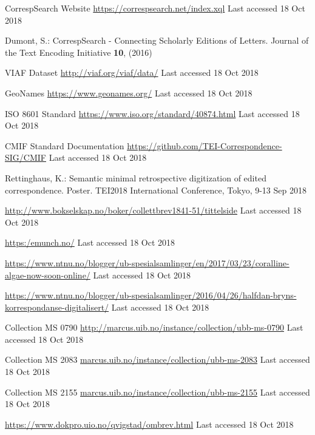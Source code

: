 \documentclass[runningheads]{llncs}
\begin{document}
\begin{thebibliography}{8}

CorrespSearch Website \url{https://correspsearch.net/index.xql}
Last accessed 18 Oct 2018

Dumont, S.: CorrespSearch - Connecting Scholarly Editions of Letters. Journal of the Text Encoding Initiative \textbf{10}, (2016)

VIAF Dataset \url{http://viaf.org/viaf/data/}
Last accessed 18 Oct 2018

GeoNames \url{https://www.geonames.org/}
Last accessed 18 Oct 2018

ISO 8601 Standard \url{https://www.iso.org/standard/40874.html}
Last accessed 18 Oct 2018

CMIF Standard Documentation \url{https://github.com/TEI-Correspondence-SIG/CMIF}
Last accessed 18 Oct 2018

Rettinghaus, K.: Semantic minimal retrospective digitization of edited correspondence. Poster. TEI2018 International Conference, Tokyo, 9-13 Sep 2018

\url{http://www.bokselskap.no/boker/collettbrev1841-51/tittelside}
Last accessed 18 Oct 2018

\url{https:/emunch.no/}
Last accessed 18 Oct 2018

\url{https://www.ntnu.no/blogger/ub-spesialsamlinger/en/2017/03/23/coralline-algae-now-soon-online/}
Last accessed 18 Oct 2018

\url{https://www.ntnu.no/blogger/ub-spesialsamlinger/2016/04/26/halfdan-bryns-korrespondanse-digitalisert/}
Last accessed 18 Oct 2018

Collection MS 0790 \url{http://marcus.uib.no/instance/collection/ubb-ms-0790}
Last accessed 18 Oct 2018

Collection MS 2083 \url{marcus.uib.no/instance/collection/ubb-ms-2083}
Last accessed 18 Oct 2018

Collection MS 2155 \url{marcus.uib.no/instance/collection/ubb-ms-2155}
Last accessed 18 Oct 2018

\url{https://www.dokpro.uio.no/qvigstad/ombrev.html}
Last accessed 18 Oct 2018

\end{thebibliography}
\end{document}
